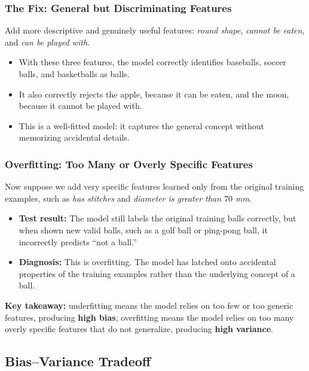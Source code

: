 \documentclass[12pt,openany]{book}
\begin{document}
\subsubsection{The Fix: General but Discriminating Features}

Add more descriptive and genuinely useful features: \textit{round shape}, \textit{cannot be eaten}, and \textit{can be played with}.

\begin{itemize}[leftmargin=*]
    \item With these three features, the model correctly identifies baseballs, soccer balls, and basketballs as balls.
    \item It also correctly rejects the apple, because it can be eaten, and the moon, because it cannot be played with.
    \item This is a well-fitted model: it captures the general concept without memorizing accidental details.
\end{itemize}

\subsubsection{Overfitting: Too Many or Overly Specific Features}

Now suppose we add very specific features learned only from the original training examples, such as \textit{has stitches} and \textit{diameter is greater than \(70\) mm}.

\begin{itemize}[leftmargin=*]
    \item \textbf{Test result:} The model still labels the original training balls correctly, but when shown new valid balls, such as a golf ball or ping-pong ball, it incorrectly predicts ``not a ball.''
    \item \textbf{Diagnosis:} This is overfitting. The model has latched onto accidental properties of the training examples rather than the underlying concept of a ball.
\end{itemize}

\textbf{Key takeaway:} underfitting means the model relies on too few or too generic features, producing \textbf{high bias}; overfitting means the model relies on too many overly specific features that do not generalize, producing \textbf{high variance}.

\subsection{Bias--Variance Tradeoff}
\end{document}
